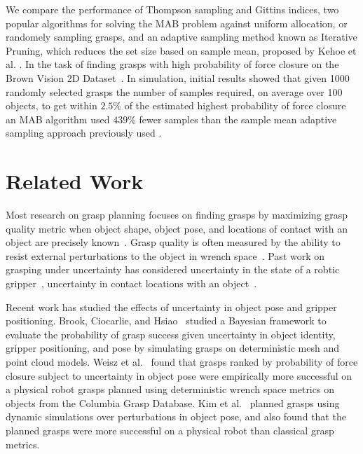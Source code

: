 \documentclass[10pt, conference]{ieeeconf}      %
\begin{document}
We compare the performance of Thompson sampling and Gittins indices, two popular algorithms for solving the MAB problem against uniform allocation, or randomely sampling grasps, and an adaptive sampling method known as Iterative Pruning, which reduces the set size based on sample mean, proposed by Kehoe et al. \cite{kehoe2012toward}. In the task of finding grasps with high probability of force closure on the Brown Vision 2D Dataset~\cite{brown, christopoulos2007handling}.
In simulation, initial results  showed that given 1000 randomly selected grasps the number of samples required, on average over 100 objects, to get within $2.5\%$ of the estimated highest probability of force closure an MAB algorithm used $439\%$ fewer samples than the sample mean adaptive sampling approach previously used .


\section{Related Work}

Most research on grasp planning focuses on finding grasps by maximizing grasp quality metric when object shape, object pose, and locations of contact with an object are precisely known~\cite{cheong2011output, ciocarlie2009}.
Grasp quality is often measured by the ability to resist external perturbations to the object in wrench space~\cite{ferrari1992, miller2004graspit}.
Past work on grasping under uncertainty has considered uncertainty in the state of a robtic gripper~\cite{goldberg1990bayesian, stulp2011learning}, uncertainty in contact locations with an object~\cite{zheng2005}.

Recent work has studied the effects of uncertainty in object pose and gripper positioning.
 Brook, Ciocarlie, and Hsiao~\cite{brook2011collaborative, hsiao2011bayesian} studied a Bayesian framework to evaluate the probability of grasp success given uncertainty in object identity, gripper positioning, and pose by simulating grasps on deterministic mesh and point cloud models.
Weisz et al.~\cite{weisz2012pose} found that grasps ranked by probability of force closure subject to uncertainty in object pose were empirically more successful on a physical robot grasps planned using deterministic wrench space metrics on objects from the Columbia Grasp Database.
Kim et al.~\cite{kim2012physically} planned grasps using dynamic simulations over perturbations in object pose, and also found that the planned grasps were more successful on a physical robot than classical grasp metrics.
\end{document}
